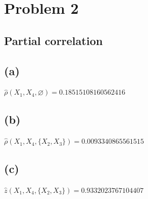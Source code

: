 \documentclass[10pt]{article}
\begin{document}
\section{Problem 2}
\subsection{Partial correlation}
\subsection{(a)}
$\widehat{\rho}\left(X_1, X_4, \varnothing\right) = 0.18515108160562416$

\subsection{(b)}
$\widehat{\rho}\left(X_1, X_4, \{X_2, X_3\}\right) = 0.0093340865561515$

\subsection{(c)}
$\widehat{z}\left(X_1, X_4, \{X_2, X_3\}\right) = 0.9332023767104407$
\end{document}
